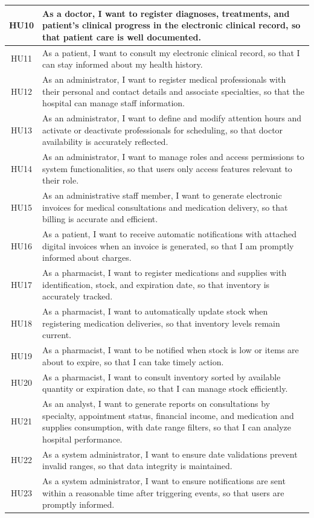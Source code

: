 \begin{longtable}{|c|p{12cm}|}
\hline
HU10 & As a doctor, I want to register diagnoses, treatments, and patient’s clinical progress in the electronic clinical record, so that patient care is well documented. \\
\hline
HU11 & As a patient, I want to consult my electronic clinical record, so that I can stay informed about my health history. \\
\hline
HU12 & As an administrator, I want to register medical professionals with their personal and contact details and associate specialties, so that the hospital can manage staff information. \\
\hline
HU13 & As an administrator, I want to define and modify attention hours and activate or deactivate professionals for scheduling, so that doctor availability is accurately reflected. \\
\hline
HU14 & As an administrator, I want to manage roles and access permissions to system functionalities, so that users only access features relevant to their role. \\
\hline
HU15 & As an administrative staff member, I want to generate electronic invoices for medical consultations and medication delivery, so that billing is accurate and efficient. \\
\hline
HU16 & As a patient, I want to receive automatic notifications with attached digital invoices when an invoice is generated, so that I am promptly informed about charges. \\
\hline
HU17 & As a pharmacist, I want to register medications and supplies with identification, stock, and expiration date, so that inventory is accurately tracked. \\
\hline
HU18 & As a pharmacist, I want to automatically update stock when registering medication deliveries, so that inventory levels remain current. \\
\hline
HU19 & As a pharmacist, I want to be notified when stock is low or items are about to expire, so that I can take timely action. \\
\hline
HU20 & As a pharmacist, I want to consult inventory sorted by available quantity or expiration date, so that I can manage stock efficiently. \\
\hline
HU21 & As an analyst, I want to generate reports on consultations by specialty, appointment status, financial income, and medication and supplies consumption, with date range filters, so that I can analyze hospital performance. \\
\hline
HU22 & As a system administrator, I want to ensure date validations prevent invalid ranges, so that data integrity is maintained. \\
\hline
HU23 & As a system administrator, I want to ensure notifications are sent within a reasonable time after triggering events, so that users are promptly informed. \\
\end{longtable}

